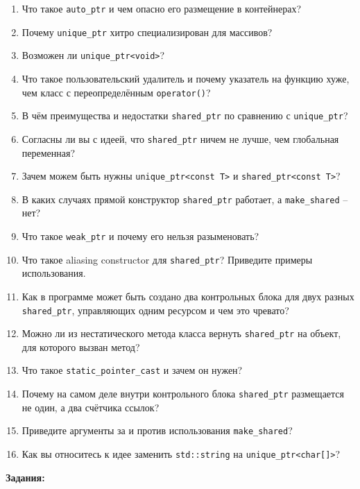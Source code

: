 \documentclass[a4paper,12pt,oneside]{article}
\begin{document}
\begin{enumerate}
\item Что такое \lstinline!auto_ptr! и чем опасно его размещение в контейнерах?
\item Почему \lstinline!unique_ptr! хитро специализирован для массивов?
\item Возможен ли \lstinline!unique_ptr<void>!?
\item Что такое пользовательский удалитель и почему указатель на функцию хуже, чем класс с переопределённым \lstinline!operator()!?
\item В чём преимущества и недостатки \lstinline!shared_ptr! по сравнению с \lstinline!unique_ptr!?
\item Согласны ли вы с идеей, что \lstinline!shared_ptr! ничем не лучше, чем глобальная переменная?
\item Зачем можем быть нужны \lstinline!unique_ptr<const T>! и \lstinline!shared_ptr<const T>!?
\item В каких случаях прямой конструктор \lstinline!shared_ptr! работает, а \lstinline!make_shared! -- нет?
\item Что такое \lstinline!weak_ptr! и почему его нельзя разыменовать?
\item Что такое aliasing constructor для \lstinline!shared_ptr!? Приведите примеры использования.
\item Как в программе может быть создано два контрольных блока для двух разных \lstinline!shared_ptr!, управляющих одним ресурсом и чем это чревато?
\item Можно ли из нестатического метода класса вернуть \lstinline!shared_ptr! на объект, для которого вызван метод?
\item Что такое \lstinline!static_pointer_cast! и зачем он нужен?
\item Почему на самом деле внутри контрольного блока \lstinline!shared_ptr! размещается не один, а два счётчика ссылок?
\item Приведите аргументы за и против использования \lstinline!make_shared!?
\item Как вы относитесь к идее заменить \lstinline!std::string! на \lstinline!unique_ptr<char[]>!?
\end{enumerate}

\textbf{Задания:}
\end{document}
